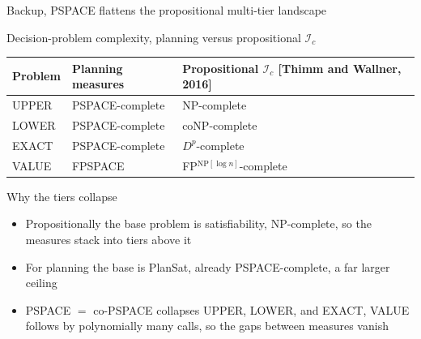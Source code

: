 \begin{frame}[noframenumbering]{Backup, PSPACE flattens the propositional multi-tier landscape}
    \hypertarget{bk:pspace-compare}{}
    \begin{exampleblock}{Decision-problem complexity, planning versus propositional $\mathcal{I}_c$}
        \centering
        \footnotesize
        \begin{tabular}{lll}
            \toprule
            Problem & Planning measures & Propositional $\mathcal{I}_c$ [Thimm and Wallner, 2016] \\
            \midrule
            UPPER   & PSPACE-complete   & NP-complete                                             \\
            LOWER   & PSPACE-complete   & coNP-complete                                           \\
            EXACT   & PSPACE-complete   & $D^p$-complete                                          \\
            VALUE   & FPSPACE           & FP$^{\text{NP}[\log n]}$-complete                       \\
            \bottomrule
        \end{tabular}
    \end{exampleblock}

    \begin{block}{Why the tiers collapse}
        \footnotesize
        \begin{itemize}
            \item Propositionally the base problem is satisfiability, NP-complete, so the measures stack into tiers above it
            \item For planning the base is PlanSat, already PSPACE-complete, a far larger ceiling
            \item PSPACE $=$ co-PSPACE collapses UPPER, LOWER, and EXACT, VALUE follows by polynomially many calls, so the gaps between measures vanish
        \end{itemize}
    \end{block}

\end{frame}


